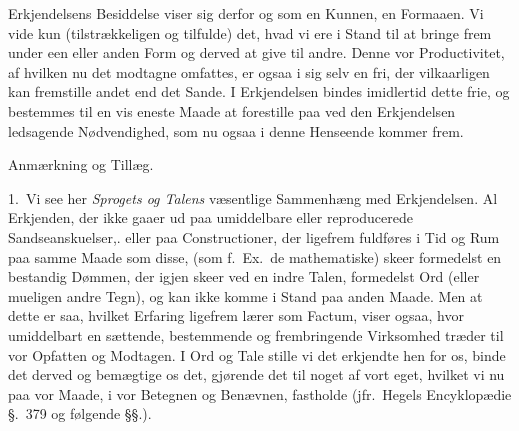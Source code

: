 \documentclass[12pt,a4paper]{book}
\newcommand{\apage}[1]{\marginnote{\footnotesize\textit{[#1]}}}
\begin{document}
Erkjendelsens Besiddelse viser sig derfor og som en Kunnen, en
Formaaen. Vi vide kun \apage{20} (tilstrækkeligen og tilfulde) det, hvad vi ere i
Stand til at bringe frem under een eller anden Form og derved at give til andre.
Denne vor Productivitet, af hvilken nu det modtagne omfattes, er ogsaa i sig
selv en fri, der vilkaarligen kan fremstille andet end det Sande. I Erkjendelsen
bindes imidlertid dette frie, og bestemmes til en vis eneste Maade at forestille
paa ved den Erkjendelsen ledsagende Nødvendighed, som nu ogsaa i denne Henseende
kommer frem.

\begin{center}Anmærkning og Tillæg.\end{center}

1.~Vi see her \emph{Sprogets og Talens} væsentlige Sammenhæng med Erkjendelsen.
Al Erkjenden, der ikke gaaer ud paa umiddelbare eller reproducerede
Sandseanskuelser,. eller paa Constructioner, der ligefrem fuldføres i Tid og Rum
paa samme Maade som disse, (som f.~Ex.\ de mathematiske) skeer formedelst en
bestandig Dømmen, der igjen skeer ved en indre Talen, formedelst Ord (eller
mueligen andre Tegn), og kan ikke komme i Stand paa anden Maade. Men at dette er
saa, hvilket Erfaring ligefrem lærer som Factum, viser ogsaa, hvor umiddelbart
en sættende, bestemmende og frembringende Virksomhed træder til vor Opfatten og
Modtagen. I Ord og Tale stille vi det erkjendte hen for os, binde det derved og
bemægtige os det, gjørende det til noget af vort eget, hvilket \apage{21}  vi nu paa vor
Maade, i vor Betegnen og Benævnen, fastholde (jfr.\ Hegels Encyklopædie §.~379
og følgende §§.).
\end{document}
